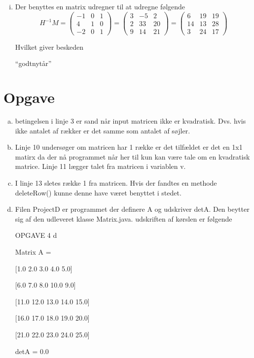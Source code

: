 \documentclass[12pt]{article}
\begin{document}
\begin{enumerate}[(a)]
\begin{enumerate}[(i)]
\item
Der benyttes en matrix udregner til at udregne følgende
$$
H^{-1}M = \left(\begin{array}{ccc}
-1&0&1\\
4&1&0\\
-2&0&1
\end{array}\right) = \left(\begin{array}{ccc}
3&-5&2\\
2&33&20\\
9&14&21
\end{array}\right)=
\left(\begin{array}{ccc}
6&19&19\\
14&13&28\\
3&24&17
\end{array}\right)
$$

Hvilket giver beskeden 

``godtnytår''
\end{enumerate}
\end{enumerate}
\section{Opgave}
\begin{enumerate}[(a)]
\item

betingelsen i linje 3 er sand når input matricen ikke er kvadratisk. Dvs. hvis
ikke antalet af rækker er det samme som antalet af søjler.

\item 
Linje 10 undersøger om matricen har 1 række er det tilfældet er det en 1x1
matirx da der nå programmet når her til kun kan være tale om en kvadratisk
matrice. Linje 11 lægger talet fra matricen i variablen v.

\item
I linje 13 sletes række 1 fra matricen. Hvis der fandtes en methode deleteRow()
kunne denne have været benyttet i stedet.
\item 
Filen ProjectD er programmet der definere A og udskriver detA. Den beytter sig
af den udleveret klasse Matrix.java.
udskriften af kørslen er følgende

OPGAVE 4 d 

Matrix A = 

[1.0 2.0 3.0 4.0 5.0]

[6.0 7.0 8.0 10.0 9.0]

[11.0 12.0 13.0 14.0 15.0]

[16.0 17.0 18.0 19.0 20.0]

[21.0 22.0 23.0 24.0 25.0]

detA = 0.0

 
\end{enumerate}
\end{document}

